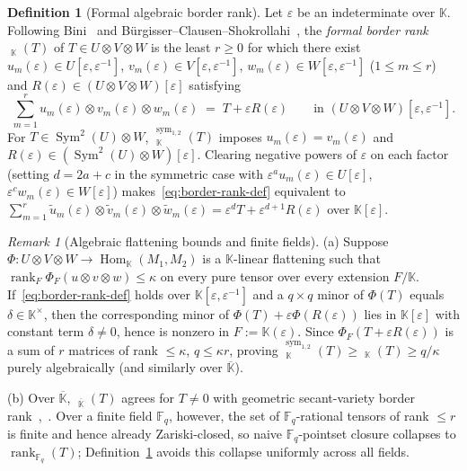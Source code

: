 \documentclass[11pt,reqno]{amsart}
\theoremstyle{definition}
\newtheorem{definition}[theorem]{Definition}
\theoremstyle{remark}
\newtheorem{remark}[theorem]{Remark}
\numberwithin{equation}{section}
\newcommand{\FF}{\mathbb{F}}
\newcommand{\KK}{\mathbb{K}}
\DeclareMathOperator{\rk}{rank}
\DeclareMathOperator{\brk}{\underline{rank}}
\DeclareMathOperator{\Sym}{Sym}
\DeclareMathOperator{\Hom}{Hom}
\begin{document}
\begin{definition}[Formal algebraic border rank]\label{def:border-rank}
Let $\varepsilon$ be an indeterminate over $\KK$. Following Bini~\cite{Bini1980} and B\"urgisser--Clausen--Shokrollahi~\cite[\S15.4]{BCS1997}, the \emph{formal border rank} $\brk_{\KK}(T)$ of $T \in U \otimes V \otimes W$ is the least $r \ge 0$ for which there exist $u_m(\varepsilon) \in U[\varepsilon, \varepsilon^{-1}]$, $v_m(\varepsilon) \in V[\varepsilon, \varepsilon^{-1}]$, $w_m(\varepsilon) \in W[\varepsilon, \varepsilon^{-1}]$ ($1 \le m \le r$) and $R(\varepsilon) \in (U \otimes V \otimes W)[\varepsilon]$ satisfying
\begin{equation}\label{eq:border-rank-def}
  \sum_{m=1}^r u_m(\varepsilon) \otimes v_m(\varepsilon) \otimes w_m(\varepsilon) \;=\; T + \varepsilon R(\varepsilon) \qquad \text{in } (U \otimes V \otimes W)[\varepsilon, \varepsilon^{-1}].
\end{equation}
For $T \in \Sym^2(U) \otimes W$, $\brk_{\KK}^{\mathrm{sym}_{1,2}}(T)$ imposes $u_m(\varepsilon) = v_m(\varepsilon)$ and $R(\varepsilon) \in (\Sym^2(U) \otimes W)[\varepsilon]$. Clearing negative powers of $\varepsilon$ on each factor (setting $d = 2a + c$ in the symmetric case with $\varepsilon^a u_m(\varepsilon) \in U[\varepsilon]$, $\varepsilon^c w_m(\varepsilon) \in W[\varepsilon]$) makes~\eqref{eq:border-rank-def} equivalent to $\sum_{m=1}^r \tilde{u}_m(\varepsilon) \otimes \tilde{v}_m(\varepsilon) \otimes \tilde{w}_m(\varepsilon) = \varepsilon^d T + \varepsilon^{d+1} R(\varepsilon)$ over $\KK[\varepsilon]$.
\end{definition}

\begin{remark}[Algebraic flattening bounds and finite fields]\label{rem:border-rank-props}
(a) Suppose $\Phi : U \otimes V \otimes W \to \Hom_{\KK}(M_1, M_2)$ is a $\KK$-linear flattening such that $\rk_F\Phi_F(u \otimes v \otimes w) \le \kappa$ on every pure tensor over every extension $F/\KK$. If~\eqref{eq:border-rank-def} holds over $\KK[\varepsilon, \varepsilon^{-1}]$ and a $q \times q$ minor of $\Phi(T)$ equals $\delta \in \KK^\times$, then the corresponding minor of $\Phi(T) + \varepsilon\Phi(R(\varepsilon))$ lies in $\KK[\varepsilon]$ with constant term $\delta \neq 0$, hence is nonzero in $F := \KK(\varepsilon)$. Since $\Phi_F(T + \varepsilon R(\varepsilon))$ is a sum of $r$ matrices of rank $\le \kappa$, $q \le \kappa r$, proving $\brk_{\KK}^{\mathrm{sym}_{1,2}}(T) \ge \brk_{\KK}(T) \ge q/\kappa$ purely algebraically (and similarly over $\overline{\KK}$).

(b) Over $\overline{\KK}$, $\brk_{\overline{\KK}}(T)$ agrees for $T \neq 0$ with geometric secant-variety border rank~\cite[Theorem~20.24]{BCS1997},~\cite{Landsberg2012}. Over a finite field $\FF_q$, however, the set of $\FF_q$-rational tensors of rank $\le r$ is finite and hence already Zariski-closed, so naive $\FF_q$-pointset closure collapses to $\rk_{\FF_q}(T)$; Definition~\ref{def:border-rank} avoids this collapse uniformly across all fields.
\end{remark}
\end{document}
